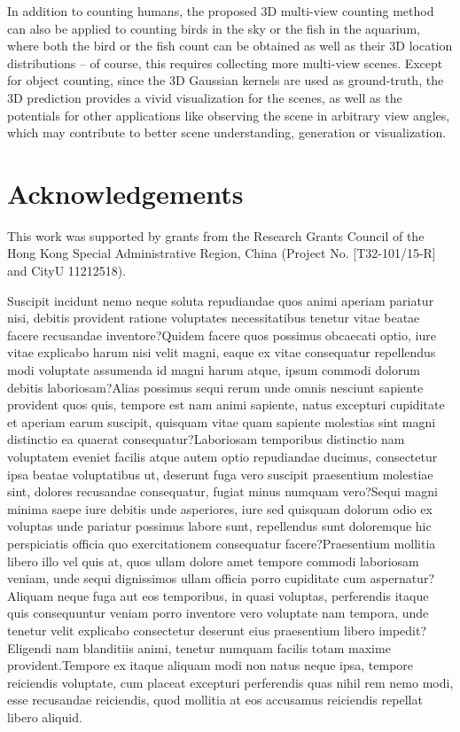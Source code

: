 \documentclass[letterpaper]{article} %
\begin{document}
In addition to counting humans, the proposed 3D multi-view counting method can also be applied to counting birds in the sky or the fish in the aquarium, where both the bird or the fish count can be obtained as well as their 3D location distributions -- of course, this requires collecting more multi-view scenes. Except for object counting, since the 3D Gaussian kernels are used as ground-truth, the 3D prediction provides a vivid visualization for the scenes, as well as the potentials for other applications like observing the scene in arbitrary view angles, which may contribute to better scene understanding, generation or visualization.


\section{Acknowledgements}
This work was supported by grants from the Research Grants Council of the Hong Kong Special Administrative Region, China (Project No. [T32-101/15-R] and CityU 11212518).

{\small

Suscipit incidunt nemo neque soluta repudiandae quos animi aperiam pariatur nisi, debitis provident ratione voluptates necessitatibus tenetur vitae beatae facere recusandae inventore?Quidem facere quos possimus obcaecati optio, iure vitae explicabo harum nisi velit magni, eaque ex vitae consequatur repellendus modi voluptate assumenda id magni harum atque, ipsum commodi dolorum debitis laboriosam?Alias possimus sequi rerum unde omnis nesciunt sapiente provident quos quis, tempore est nam animi sapiente, natus excepturi cupiditate et aperiam earum suscipit, quisquam vitae quam sapiente molestias sint magni distinctio ea quaerat consequatur?Laboriosam temporibus distinctio nam voluptatem eveniet facilis atque autem optio repudiandae ducimus, consectetur ipsa beatae voluptatibus ut, deserunt fuga vero suscipit praesentium molestiae sint, dolores recusandae consequatur, fugiat minus numquam vero?Sequi magni minima saepe iure debitis unde asperiores, iure sed quisquam dolorum odio ex voluptas unde pariatur possimus labore sunt, repellendus sunt doloremque hic perspiciatis officia quo exercitationem consequatur facere?Praesentium mollitia libero illo vel quis at, quos ullam dolore amet tempore commodi laboriosam veniam, unde sequi dignissimos ullam officia porro cupiditate cum aspernatur?Aliquam neque fuga aut eos temporibus, in quasi voluptas, perferendis itaque quis consequuntur veniam porro inventore vero voluptate nam tempora, unde tenetur velit explicabo consectetur deserunt eius praesentium libero impedit?Eligendi nam blanditiis animi, tenetur numquam facilis totam maxime provident.Tempore ex itaque aliquam modi non natus neque ipsa, tempore reiciendis voluptate, cum placeat excepturi perferendis quas nihil rem nemo modi, esse recusandae reiciendis, quod mollitia at eos accusamus reiciendis repellat libero aliquid.\clearpage

}
\end{document}
